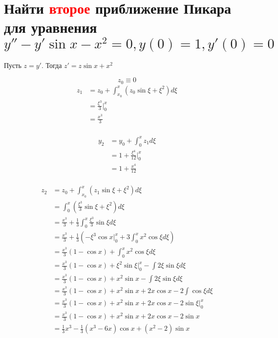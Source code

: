 \section{Найти \textcolor{red}{второе} приближение Пикара для уравнения $y''-y'\sin x - x^2 =0, y(0)=1, y'(0)=0$}

Пусть $z = y'$. Тогда $z' = z \sin x + x^2$

\[z_0 \equiv 0\]
\begin{align*}
    z_1 & = z_0 + \int_{x_0}^x (z_0 \sin \xi + \xi^2) d\xi \\
        & = \frac{\xi^3}{3} \Big|_0^x                      \\
        & = \frac{x^3}{3}                                  \\
\end{align*}

\begin{align*}
    y_2 & = y_0 + \int_0^x z_1 d\xi       \\
        & = 1 + \frac{\xi^4}{12}\Big|_0^x \\
        & = 1 + \frac{x^4}{12}            \\
\end{align*}

\begin{align*}
    z_2 & = z_0 + \int_{x_0}^x (z_1 \sin \xi + \xi^2) d\xi                                                 \\
        & = \int_{0}^x \left(\frac{\xi^3}{3} \sin \xi + \xi^2\right) d\xi                                  \\
        & = \frac{x^3}{3} + \frac{1}{3}\int_{0}^x \frac{\xi^3}{3} \sin \xi d\xi                            \\
        & = \frac{x^3}{3} + \frac{1}{3} \left(-\xi^3\cos x\Big|_0^x + 3\int_{0}^x x^2 \cos \xi d\xi\right) \\
        & = \frac{x^3}{3}(1 - \cos x) + \int_{0}^x x^2 \cos \xi d\xi                                       \\
        & = \frac{x^3}{3}(1 - \cos x) + \xi^2 \sin \xi \Big|_0^x - \int 2\xi \sin \xi d\xi                 \\
        & = \frac{x^3}{3}(1 - \cos x) + x^2 \sin x - \int 2\xi \sin \xi d\xi                               \\
        & = \frac{x^3}{3}(1 - \cos x) + x^2 \sin x + 2x \cos x - 2\int \cos \xi d\xi                       \\
        & = \frac{x^3}{3}(1 - \cos x) + x^2 \sin x + 2x \cos x - 2\sin \xi\Big|_0^x                        \\
        & = \frac{x^3}{3}(1 - \cos x) + x^2 \sin x + 2x \cos x - 2\sin x                                   \\
        & = \frac{1}{3} x^3 - \frac{1}{3} (x^3 - 6 x) \cos x + (x^2 - 2) \sin x                            \\
\end{align*}

